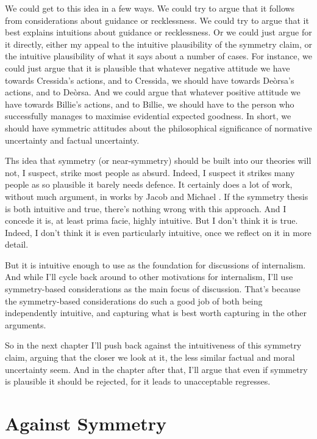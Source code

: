 We could get to this idea in a few ways. We could try to argue that it follows from considerations about guidance or recklessness. We could try to argue that it best explains intuitions about guidance or recklessness. Or we could just argue for it directly, either my appeal to the intuitive plausibility of the symmetry claim, or the intuitive plausibility of what it says about a number of cases. For instance, we could just argue that it is plausible that whatever negative attitude we have towards \gls{Cressida}'s actions, and to \gls{Cressida}, we should have towards Deòrsa's actions, and to Deòrsa. And we could argue that whatever positive attitude we have towards \gls{Billie}'s actions, and to \gls{Billie}, we should have to the person who successfully manages to maximise evidential expected goodness. In short, we should have symmetric attitudes about the philosophical significance of normative uncertainty and factual uncertainty.

Ths idea that symmetry (or near-symmetry) should be built into our theories will not, I suspect, strike most people as absurd. Indeed, I suspect it strikes many people as so plausible it barely needs defence. It certainly does a lot of work, without much argument, in works by Jacob \citet{Ross2006} and Michael \citet{Zimmerman2008}. If the symmetry thesis is both intuitive and true, there's nothing wrong with this approach. And I concede it is, at least prima facie, highly intuitive. But I don't think it is true. Indeed, I don't think it is even particularly intuitive, once we reflect on it in more detail.

But it is intuitive enough to use as the foundation for discussions of internalism. And while I'll cycle back around to other motivations for internalism, I'll use symmetry-based considerations as the main focus of discussion. That's because the symmetry-based considerations do such a good job of both being independently intuitive, and capturing what is best worth capturing in the other arguments.

So in the next chapter I'll push back against the intuitiveness of this symmetry claim, arguing that the closer we look at it, the less similar factual and moral uncertainty seem. And in the chapter after that, I'll argue that even if symmetry is plausible it should be rejected, for it leads to unacceptable regresses.

\chapter{Against Symmetry}
\label{againstsymmetry}

